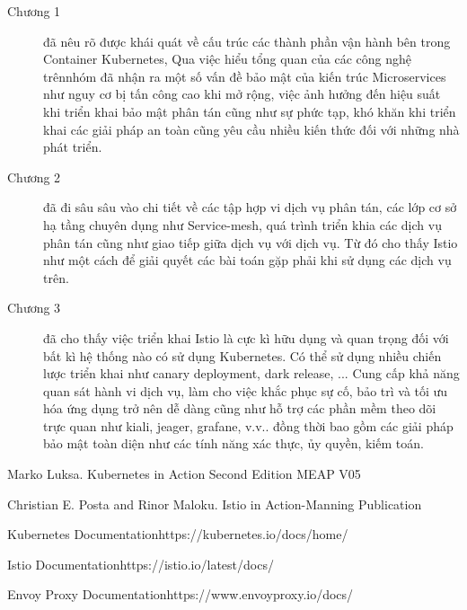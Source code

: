 \documentclass[14pt,a4paper]{book}
\begin{document}
{{	\begin{description}
		\item[Chương 1] đã nêu rõ được khái quát về cấu trúc các thành phần vận hành bên trong Container Kubernetes, Qua việc hiểu tổng quan của các công nghệ trênnhóm đã nhận ra một số vấn đề bảo mật của kiến trúc Microservices như nguy cơ bị tấn công cao khi mở rộng, việc ảnh hưởng đến hiệu suất khi triển khai bảo mật phân tán cũng như sự phức tạp, khó khăn khi triển khai các giải pháp an toàn cũng yêu cầu nhiều kiến thức đối với những nhà phát triển.
		\item[Chương 2] đã đi sâu sâu vào chi tiết về các tập hợp vi dịch vụ phân tán, các lớp cơ sở hạ tầng chuyên dụng như Service-mesh, quá trình triển khia các dịch vụ phân tán cũng như giao tiếp giữa dịch vụ với dịch vụ. Từ đó cho thấy Istio như một cách để giải quyết các bài toán gặp phải khi sử dụng các dịch vụ trên.
		\item[Chương 3] đã cho thấy việc triển khai Istio là cực kì hữu dụng và quan trọng đối với bất kì hệ thống nào có sử dụng Kubernetes. Có thể sử dụng nhiều chiến lược triển khai như canary deployment, dark release, ... Cung cấp khả năng quan sát hành vi dịch vụ, làm cho việc khắc phục sự cố, bảo trì và tối ưu hóa ứng dụng trở nên dễ dàng cũng như hỗ trợ các phần mềm theo dõi trực quan như kiali, jeager, grafane, v.v.. đồng thời bao gồm các giải pháp bảo mật toàn diện như các tính năng xác thực, ủy quyền, kiếm toán.
	\end{description}


\begin{thebibliography}{9}
	Marko Luksa. Kubernetes in Action Second Edition MEAP V05 
	
	Christian E. Posta and Rinor Maloku. Istio in Action-Manning Publication
	
	Kubernetes Documentation{https://kubernetes.io/docs/home/}
	
	Istio Documentation{https://istio.io/latest/docs/}
	
	Envoy Proxy Documentation{https://www.envoyproxy.io/docs/}
\end{thebibliography}

\appendix 
{}
}}
\end{document}
